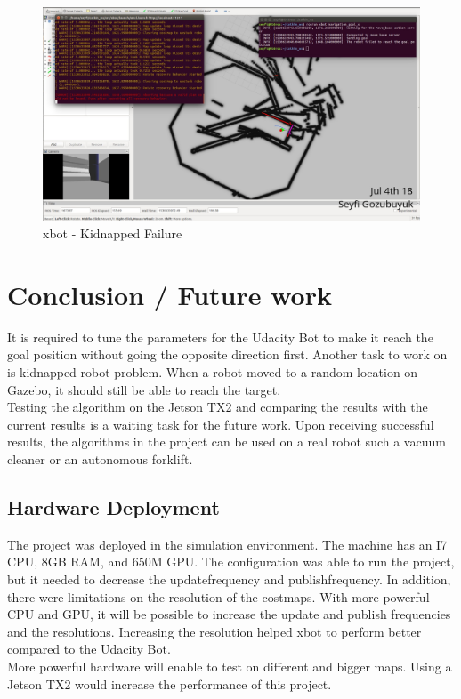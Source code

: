 \documentclass[10pt,journal,compsoc]{IEEEtran}
\begin{document}
\begin{figure}[thpb]
      \centering
      \includegraphics[width=\linewidth]{figures/xbotKidnapFail.png}
      \caption{xbot - Kidnapped Failure}
      \label{fig:xbotkidfail}
\end{figure}

\section{Conclusion / Future work}
It is required to tune the parameters for the Udacity Bot to make it reach the goal position without going the opposite direction first. Another task to work on is kidnapped robot problem. When a robot moved to a random location on Gazebo, it should still be able to reach the target.\\
Testing the algorithm on the Jetson TX2 and comparing the results with the current results is a waiting task for the future work. Upon receiving successful results, the algorithms in the project can be used on a real robot such a vacuum cleaner or an autonomous forklift.


\subsection{Hardware Deployment}
The project was deployed in the simulation environment. The machine has an I7 CPU, 8GB RAM, and 650M GPU. The configuration was able to run the project, but it needed to decrease the update\textunderscore frequency and publish\textunderscore frequency. In addition, there were limitations on the resolution of the costmaps. With more powerful CPU and GPU, it will be possible to increase the update and publish frequencies and the resolutions. Increasing the resolution helped xbot to perform better compared to the Udacity Bot. \\
More powerful hardware will enable to test on different and bigger maps. Using a Jetson TX2 would increase the performance of this project.




\end{document}
